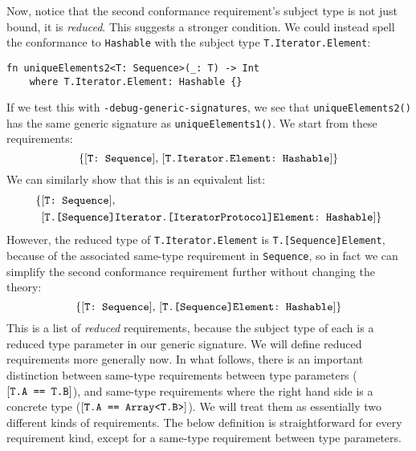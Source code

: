 \documentclass[../generics]{subfiles}
\begin{document}
Now, notice that the second conformance requirement's subject type is not just bound, it is \emph{reduced}. This suggests a stronger condition. We could instead spell the conformance to \texttt{Hashable} with the subject type \texttt{T.Iterator.Element}:
\begin{Verbatim}
fn uniqueElements2<T: Sequence>(_: T) -> Int
    where T.Iterator.Element: Hashable {}
\end{Verbatim}
If we test this with \texttt{-debug-generic-signatures}, we see that \texttt{uniqueElements2()} has the same generic signature as \texttt{uniqueElements1()}. We start from these requirements:
\[\{[\texttt{T:~Sequence}],\,[\texttt{T.Iterator.Element:~Hashable}]\}\]
We can similarly show that this is an equivalent list:
\begin{align*}
\{&[\texttt{T:~Sequence}],\,\\
&[\texttt{T.[Sequence]Iterator.[IteratorProtocol]Element:~Hashable}]\}
\end{align*}
However, the reduced type of \texttt{T.Iterator.Element} is \texttt{T.[Sequence]Element}, because of the associated same-type requirement in \texttt{Sequence}, so in fact we can simplify the second conformance requirement further without changing the theory:
\[\{[\texttt{T:~Sequence}],\,[\texttt{T.[Sequence]Element:~Hashable}]\}\]
This is a list of \emph{reduced} requirements, because the subject type of each is a reduced type parameter in our generic signature. We will define reduced requirements more generally now. In what follows, there is an important distinction between same-type requirements between type parameters ($[\texttt{T.A == T.B}]$), and same-type requirements where the right hand side is a concrete type ($[\texttt{T.A == Array<T.B>}]$). We will treat them as essentially two different kinds of requirements. The below definition is straightforward for every requirement kind, except for a same-type requirement between type parameters. 
\end{document}
